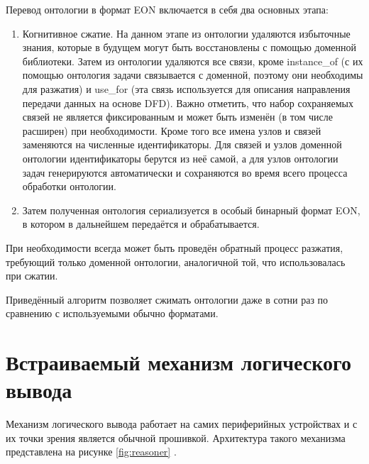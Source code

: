 Перевод онтологии в формат EON включается в себя два основных этапа:
\begin{enumerate}
	\item Когнитивное сжатие.
	На данном этапе из онтологии удаляются избыточные знания, которые в будущем могут быть восстановлены с помощью доменной библиотеки.
	Затем из онтологии удаляются все связи, кроме instance{\_}of (с их помощью онтология задачи связывается с доменной, поэтому они необходимы для разжатия) и use{\_}for (эта связь используется для описания направления передачи данных на основе DFD).
	Важно отметить, что набор сохраняемых связей не является фиксированным и может быть изменён (в том числе расширен) при необходимости.
	Кроме того все имена узлов и связей заменяются на численные идентификаторы.
	Для связей и узлов доменной онтологии идентификаторы берутся из неё самой, а для узлов онтологии задач генерируются автоматически и сохраняются во время всего процесса обработки онтологии.
	\item Затем полученная онтология сериализуется в особый бинарный формат EON, в котором в дальнейшем передаётся и обрабатывается.
\end{enumerate}

При необходимости всегда может быть проведён обратный процесс разжатия, требующий только доменной онтологии, аналогичной той, что использовалась при сжатии.

Приведённый алгоритм позволяет сжимать онтологии даже в сотни раз по сравнению с используемыми обычно форматами.

\section{Встраиваемый механизм логического вывода}

Механизм логического вывода работает на самих периферийных устройствах и с их точки зрения является обычной прошивкой.
Архитектура такого механизма представлена на рисунке \ref{fig:reasoner} \cite{incollection:onto-reasoning-on-mcu}.



